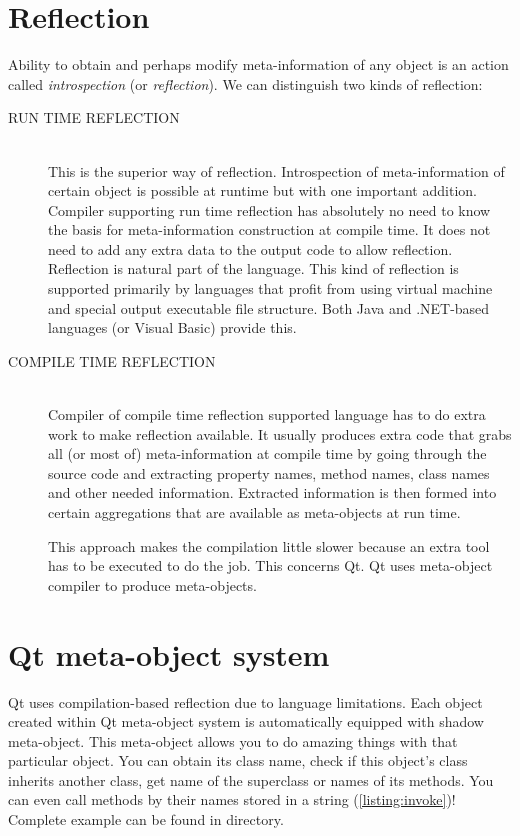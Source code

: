 \section{Reflection}
Ability to obtain and perhaps modify meta-information of any object is an action called \textit{introspection} (or \textit{reflection}). We can distinguish two kinds of reflection:
\begin{description}
\item[RUN TIME REFLECTION] \hfill \\
This is the superior way of reflection. Introspection of meta-information of certain object is possible at runtime but with one important addition. Compiler supporting run time reflection has absolutely no need to know the basis for meta-information construction at compile time. It does not need to add any extra data to the output code to allow reflection. Reflection is natural part of the language. This kind of reflection is supported primarily by languages that profit from using virtual machine and special output executable file structure. Both Java and .NET-based languages (\eg \csharp or Visual Basic) provide this.
\item[COMPILE TIME REFLECTION] \hfill \\
Compiler of compile time reflection supported language has to do extra work to make reflection available. It usually produces extra code that grabs all (or most of) meta-information at compile time by going through the source code and extracting property names, method names, class names and other needed information. Extracted information is then formed into certain aggregations that are available as meta-objects at run time.

This approach makes the compilation little slower because an extra tool has to be executed to do the job. This concerns Qt. Qt uses meta-object compiler to produce meta-objects.
\end{description}

\section{Qt meta-object system}
Qt uses compilation-based reflection due to \cpp language limitations. Each object created within Qt meta-object system is automatically equipped with shadow meta-object. This meta-object allows you to do amazing things with that particular object. You can obtain its class name, check if this object's class inherits another class, get name of the superclass or names of its methods. You can even call methods by their names stored in a string (\autoref{listing:invoke})! Complete example can be found in directory.

